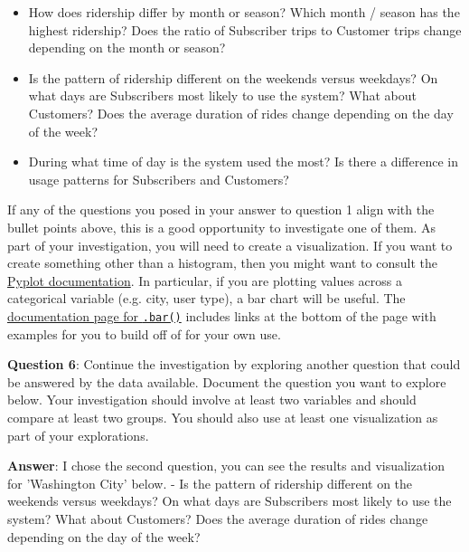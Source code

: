 \documentclass[11pt]{article}
\providecommand{\tightlist}{%
      \setlength{\itemsep}{0pt}\setlength{\parskip}{0pt}}
\begin{document}
\begin{itemize}
\tightlist
\item
  How does ridership differ by month or season? Which month / season has
  the highest ridership? Does the ratio of Subscriber trips to Customer
  trips change depending on the month or season?
\item
  Is the pattern of ridership different on the weekends versus weekdays?
  On what days are Subscribers most likely to use the system? What about
  Customers? Does the average duration of rides change depending on the
  day of the week?
\item
  During what time of day is the system used the most? Is there a
  difference in usage patterns for Subscribers and Customers?
\end{itemize}

If any of the questions you posed in your answer to question 1 align
with the bullet points above, this is a good opportunity to investigate
one of them. As part of your investigation, you will need to create a
visualization. If you want to create something other than a histogram,
then you might want to consult the
\href{https://matplotlib.org/devdocs/api/pyplot_summary.html}{Pyplot
documentation}. In particular, if you are plotting values across a
categorical variable (e.g. city, user type), a bar chart will be useful.
The
\href{https://matplotlib.org/devdocs/api/_as_gen/matplotlib.pyplot.bar.html\#matplotlib.pyplot.bar}{documentation
page for \texttt{.bar()}} includes links at the bottom of the page with
examples for you to build off of for your own use.

\textbf{Question 6}: Continue the investigation by exploring another
question that could be answered by the data available. Document the
question you want to explore below. Your investigation should involve at
least two variables and should compare at least two groups. You should
also use at least one visualization as part of your explorations.

\textbf{Answer}: I chose the second question, you can see the results
and visualization for 'Washington City' below. - Is the pattern of
ridership different on the weekends versus weekdays? On what days are
Subscribers most likely to use the system? What about Customers? Does
the average duration of rides change depending on the day of the week?
\end{document}
